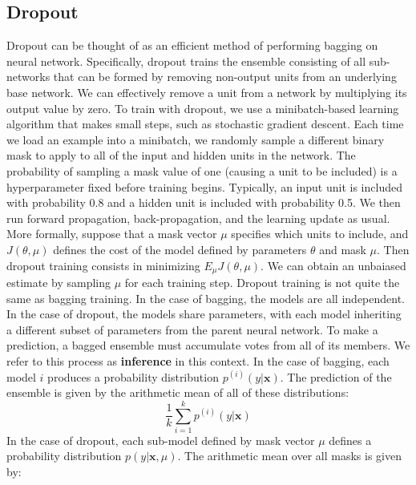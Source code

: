\subsection{Dropout}
Dropout can be thought of as an efficient method of performing bagging on neural network. Specifically, dropout trains the ensemble consisting of all sub-networks that can be formed by removing non-output units from an underlying base network. We can effectively remove a unit from a
network by multiplying its output value by zero.\newline\newline
To train with dropout, we use a minibatch-based learning algorithm that makes small steps, such as stochastic gradient descent. Each time we load an example into a minibatch, we randomly sample a different binary mask to apply to all of the input and hidden units in the network. The probability of sampling a mask value of one (causing a unit to be included) is a hyperparameter fixed before training begins. Typically, an input unit is included with probability 0.8 and a hidden unit is included with probability 0.5. We then run forward propagation, back-propagation, and the learning update as usual.\newline\newline
More formally, suppose that a mask vector $\mu$ specifies which units to include, and $J(\theta, \mu)$ defines the cost of the model defined by parameters $\theta$
and mask $\mu$. Then dropout training consists in minimizing $E_\mu J(\theta, \mu)$. We can obtain an unbaiased estimate by sampling $\mu$ for each training step.\newline\newline
Dropout training is not quite the same as bagging training. In the case of
bagging, the models are all independent. In the case of dropout, the models share parameters, with each model inheriting a different subset of parameters from the parent neural network.\newline\newline
To make a prediction, a bagged ensemble must accumulate votes from all of
its members. We refer to this process as \textbf{inference} in this context. In the case of bagging, each model $i$ produces a probability distribution $p^{(i)}(y | \textbf{x})$. The prediction of the ensemble is given by the arithmetic mean of all of these distributions:
\[\frac{1}{k}\sum_{i = 1}^{k}p^{(i)}(y | \textbf{x})\]
In the case of dropout, each sub-model defined by mask vector $\mu$ defines a probability distribution $p(y | \textbf{x}, \mu)$. The arithmetic mean over all masks is given by:
